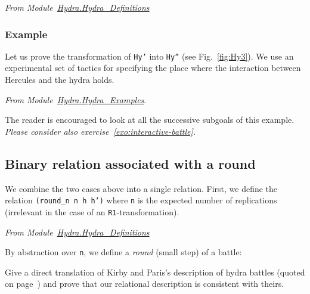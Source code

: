 \vspace{4pt}
\emph{From Module~\href{../theories/html/hydras.Hydra.Hydra_Definitions.html\#R2}{Hydra.Hydra\_Definitions}}



\subsubsection{Example}
Let us prove the transformation of \texttt{Hy'} into \texttt{Hy''} (see Fig.~\vref{fig:Hy3}). We use an experimental set of tactics for specifying the place where the 
interaction between Hercules and the hydra holds. 


\vspace{4pt}\emph{From Module~\href{../theories/html/hydras.Hydra.Hydra_Examples.html}{Hydra.Hydra\_Examples}}. 




The reader is encouraged to look at all the successive subgoals of this example.
\emph{Please consider also exercise~\vref{exo:interactive-battle}.}


\subsection{Binary relation associated with a round}

We combine the two cases above into a single relation.
First,  we define the  relation \texttt{(round\_n n h h')} where \texttt{n} is the expected number of  replications (irrelevant in the case of an \texttt{R1}-transformation).

\vspace{4pt}
\emph{From Module~\href{../theories/html/hydras.Hydra.Hydra_Definitions.html\#round_n}{Hydra.Hydra\_Definitions}}




By abstraction over \texttt{n}, we define a \emph{round} (small step) of a battle:

\label{sect:infix-round}




\begin{project}
Give a direct translation of Kirby and Paris's description of hydra battles (quoted on page~\pageref{original-rules}) and prove that our relational description is consistent with theirs.
\end{project}


